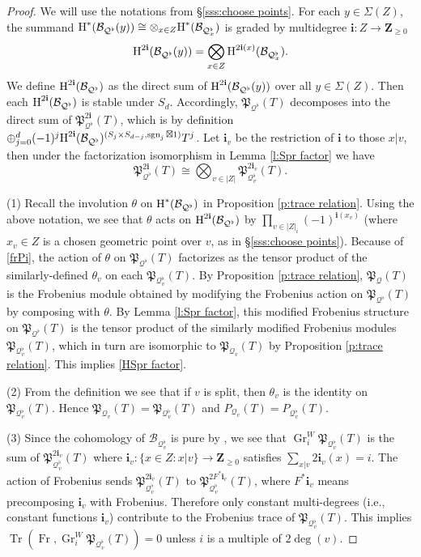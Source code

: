 \documentclass[reqno]{amsart}
\numberwithin{equation}{section}
\newcommand{\Z}{\mathbf{Z}}
\newcommand{\sgn}{\operatorname{sgn}}
\DeclareMathOperator{\Frob}{Fr}
\DeclareMathOperator{\Tr}{Tr}
\DeclareMathOperator{\Gr}{Gr}
\newcommand\Sig{\Sigma}
\newcommand{\bt}{\boxtimes}
\newcommand{\bi}{\mathbf{i}}
\newcommand\op{\oplus}
\newcommand\ot{\otimes}
\newcommand\bigot{\bigotimes}
\newcommand{\cohog}[2]{\textup{H}^{#1}({#2})}     %
\renewcommand{\th}{\theta}
\newcommand\cB{\mathcal{B}}
\newcommand\cQ{\mathcal{Q}}
\newcommand\frP{\mathfrak{P}}
\theoremstyle{remark}
\numberwithin{equation}{section}
\begin{document}
\begin{proof} We will use the notations from \S\ref{sss:choose points}. For each $y\in \Sig(Z)$, the summand $\cohog{*}{\cB_{\cQ^{\flat}}(y)}\cong \ot_{x\in Z}\cohog{*}{\cB_{\cQ^{\flat}_{x}}}$ is graded by multidegree $\bi: Z\to \Z_{\ge0}$
\begin{equation*}
\cohog{2\bi}{\cB_{\cQ^{\flat}}(y)}=\bigot_{x\in Z}\cohog{2\bi(x)}{\cB_{\cQ^{\flat}_{x}}}.
\end{equation*}
We define $\cohog{2\bi}{\cB_{\cQ^{\flat}}}$ as the direct sum of  $\cohog{2\bi}{\cB_{\cQ^{\flat}}(y)}$ over all $y\in \Sig(Z)$. Then each $\cohog{2\bi}{\cB_{\cQ^{\flat}}}$ is stable under $S_{d}$. Accordingly, $\frP_{\cQ^{\flat}}(T)$ decomposes into the direct sum of $\frP^{2\bi}_{\cQ^{\flat}}(T)$, which is by definition $\op_{j=0}^{d}(-1)^{j}\cohog{2\bi}{\cB_{\cQ^{\flat}}}^{(S_{j}\times S_{d-j}, \sgn_{j}\bt1)}T^{j}$. Let $\bi_{v}$ be the restriction of $\bi$ to those $x|v$, then under the factorization isomorphism in Lemma \ref{l:Spr factor} we have
\begin{equation}\label{frPi}
\frP^{2\bi}_{\cQ^{\flat}}(T)\cong \bigot_{v\in |Z|} \frP^{2\bi_{v}}_{\cQ^{\flat}_{v}}(T).
\end{equation}

(1) Recall the involution $\th$  on $\cohog{*}{\cB_{\cQ^{\flat}}}$ in Proposition \ref{p:trace relation}. Using the above notation,  we see that $\th$ acts on $\cohog{2\bi}{\cB_{\cQ^{\flat}}}$ by $\prod_{v\in |
Z|_{i}}(-1)^{\bi(x_{v})}$ (where $x_{v}\in Z$ is a chosen geometric point over $v$, as in \S\ref{sss:choose points}). Because of \eqref{frPi}, the action of $\th$ on $\frP_{\cQ^{\flat}}(T)$ factorizes as the tensor product of the similarly-defined $\th_{v}$ on each $\frP_{\cQ^{\flat}_{v}}(T)$. By Proposition \ref{p:trace relation}, $\frP_{\cQ}(T)$ is the Frobenius module obtained by modifying the Frobenius action on $\frP_{\cQ^{\flat}}(T)$ by composing with $\th$. By Lemma \ref{l:Spr factor}, this modified Frobenius structure on  $\frP_{\cQ^{\flat}}(T)$ is the tensor product of the similarly modified Frobenius modules $\frP_{\cQ^{\flat}_{v}}(T)$, which in turn are isomorphic to $\frP_{\cQ_{v}}(T)$ by Proposition \ref{p:trace relation}. This implies \eqref{HSpr factor}.

(2) From the definition we see that if $v$ is split, then $\th_{v}$ is the identity on $\frP_{\cQ^{\flat}_{v}}(T)$. Hence $\frP_{\cQ_{v}}(T)=\frP_{\cQ^{\flat}_{v}}(T)$ and $P_{\cQ_{v}}(T)=P_{\cQ^{\flat}_{v}}(T)$.

(3) Since the cohomology of $\cB_{\cQ^{\flat}_{v}}$ is pure by \cite[Corollary 2.3(3)]{HS77}, we see that $\Gr^{W}_{i}\frP_{\cQ^{\flat}_{v}}(T)$ is the sum of $\frP^{2\bi_{v}}_{\cQ^{\flat}_{v}}(T)$ where $\bi_{v}: \{x\in Z: x|v\}\to \Z_{\ge0}$ satisfies $\sum_{x|v}2\bi_{v}(x)=i$. The action of Frobenius sends $\frP^{2\bi_{v}}_{\cQ^{\flat}_{v}}(T)$ to $\frP^{2F^{*}\bi_{v}}_{\cQ^{\flat}_{v}}(T)$, where $F^{*}\bi_{v}$ means precomposing $\bi_{v}$ with Frobenius. Therefore only constant multi-degrees (i.e., constant functions $\bi_{v}$) contribute to the Frobenius trace of $\frP_{\cQ^{\flat}_{v}}(T)$. This implies $\Tr(\Frob, \Gr^{W}_{i}\frP_{\cQ^{\flat}_{v}}(T))=0$ unless $i$ is a multiple of $2\deg(v)$.


\end{proof}
\end{document}
